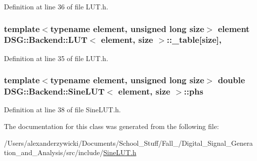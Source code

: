 Definition at line 36 of file L\+U\+T.\+h.

\hypertarget{classDSG_1_1Backend_1_1LUT_a23615428e84d6be4424c8b897866f253}{
\subsubsection[{\+\_\+table}]{\setlength{\rightskip}{0pt plus 5cm}template$<$typename element, unsigned long size$>$ element {\bf D\+S\+G\+::\+Backend\+::\+L\+U\+T}$<$ element, size $>$\+::\+\_\+table\mbox{[}size\mbox{]}\hspace{0.3cm}{\ttfamily [protected]}, {\ttfamily [inherited]}}}\label{classDSG_1_1Backend_1_1LUT_a23615428e84d6be4424c8b897866f253}


Definition at line 35 of file L\+U\+T.\+h.

\hypertarget{classDSG_1_1Backend_1_1SineLUT_a4745a2ef3a5cec8f2822fa12174e059b}{
\subsubsection[{phs}]{\setlength{\rightskip}{0pt plus 5cm}template$<$typename element, unsigned long size$>$ double {\bf D\+S\+G\+::\+Backend\+::\+Sine\+L\+U\+T}$<$ element, size $>$\+::phs\hspace{0.3cm}{\ttfamily [protected]}}}\label{classDSG_1_1Backend_1_1SineLUT_a4745a2ef3a5cec8f2822fa12174e059b}


Definition at line 38 of file Sine\+L\+U\+T.\+h.



The documentation for this class was generated from the following file\+:\begin{DoxyCompactItemize}
\item 
/\+Users/alexanderzywicki/\+Documents/\+School\+\_\+\+Stuff/\+Fall\+\_/\+Digital\+\_\+\+Signal\+\_\+\+Generation\+\_\+and\+\_\+\+Analysis/src/include/\hyperlink{SineLUT_8h}{Sine\+L\+U\+T.\+h}\end{DoxyCompactItemize}
